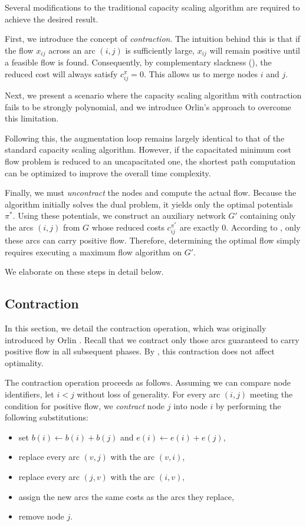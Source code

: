Several modifications to the traditional capacity scaling algorithm are required to achieve the desired result.

First, we introduce the concept of \textit{contraction}. The intuition behind this is that if the flow $x_{ij}$ across an arc $(i,j)$ is sufficiently large, $x_{ij}$ will remain positive until a feasible flow is found. Consequently, by complementary slackness (), the reduced cost will always satisfy $c_{ij}^\pi = 0$. This allows us to merge nodes $i$ and $j$.

Next, we present a scenario where the capacity scaling algorithm with contraction fails to be strongly polynomial, and we introduce Orlin's approach to overcome this limitation.

Following this, the augmentation loop remains largely identical to that of the standard capacity scaling algorithm. However, if the capacitated minimum cost flow problem is reduced to an uncapacitated one, the shortest path computation can be optimized to improve the overall time complexity.

Finally, we must \textit{uncontract} the nodes and compute the actual flow. Because the algorithm initially solves the dual problem, it yields only the optimal potentials $\pi^*$. Using these potentials, we construct an auxiliary network $G'$ containing only the arcs $(i,j)$ from $G$ whose reduced costs $c_{ij}^{\pi^*}$ are exactly $0$. According to , only these arcs can carry positive flow. Therefore, determining the optimal flow simply requires executing a maximum flow algorithm on $G'$.

We elaborate on these steps in detail below.

\subsection{Contraction}\label{sec:contraction}
In this section, we detail the contraction operation, which was originally introduced by Orlin \cite{orlin1993faster}. Recall that we contract only those arcs guaranteed to carry positive flow in all subsequent phases. By , this contraction does not affect optimality.

The contraction operation proceeds as follows. Assuming we can compare node identifiers, let $i < j$ without loss of generality. For every arc $(i,j)$ meeting the condition for positive flow, we \textit{contract} node $j$ into node $i$ by performing the following substitutions:
\begin{itemize}
    \item set $b(i) \gets b(i) + b(j)$ and $e(i) \gets e(i) + e(j)$,
    \item replace every arc $(v,j)$ with the arc $(v,i)$,
    \item replace every arc $(j,v)$ with the arc $(i,v)$,
    \item assign the new arcs the same costs as the arcs they replace,
    \item remove node $j$.
\end{itemize}

